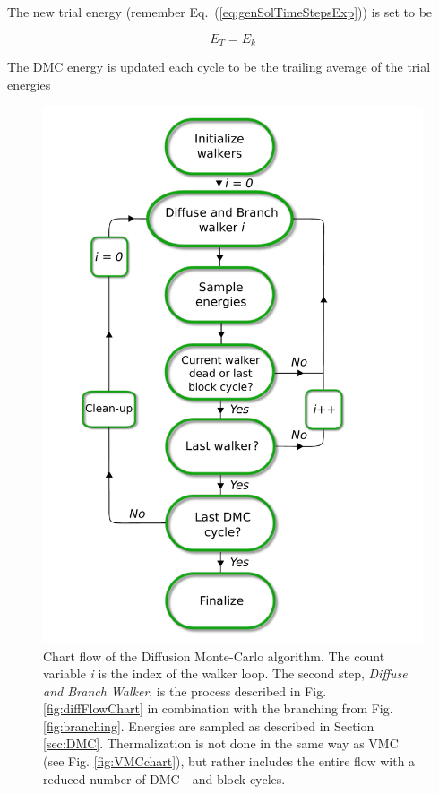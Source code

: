 The new trial energy (remember Eq.~(\ref{eq:genSolTimeStepsExp})) is set to be 

\begin{equation}
 E_T = E_k
\end{equation}

The DMC energy is updated each cycle to be the trailing average of the trial energies


\begin{figure}
 \begin{center}
  \includegraphics[scale=0.65]{../Graphics/DMCUML.pdf}
  \caption{Chart flow of the Diffusion Monte-Carlo algorithm. The count variable \textit{i} is the index of the walker loop. The second step, \textit{Diffuse and Branch Walker}, is the process described in Fig. \ref{fig:diffFlowChart} in combination with the branching from Fig. \ref{fig:branching}. Energies are sampled as described in Section \ref{sec:DMC}. Thermalization is not done in the same way as VMC (see Fig. \ref{fig:VMCchart}), but rather includes the entire flow with a reduced number of DMC - and block cycles.}
  \label{fig:DMCchart}
 \end{center}
\end{figure}
\clearpage


